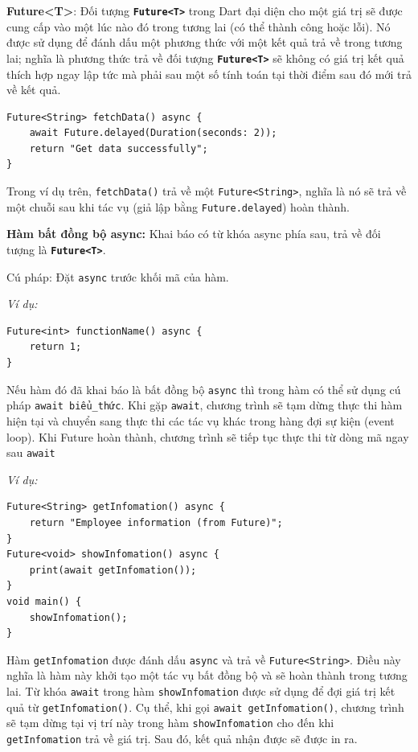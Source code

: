 \documentclass[../DoAn.tex]{subfiles}
\numberwithin{figure}{chapter}
\begin{document}
\textbf{Future<T>}: Đối tượng \textbf{\texttt{Future<T>}} trong Dart đại diện cho một giá trị sẽ được cung cấp vào một lúc nào đó trong tương lai (có thể thành công hoặc lỗi). Nó được sử dụng để đánh dấu một phương thức với một kết quả trả về trong tương lai; nghĩa là phương thức trả về đối tượng \textbf{\texttt{Future<T>}} sẽ không có giá trị kết quả thích hợp ngay lập tức mà phải sau một số tính toán tại thời điểm sau đó mới trả về kết quả. 
\begin{lstlisting}
Future<String> fetchData() async {
    await Future.delayed(Duration(seconds: 2));
    return "Get data successfully";
}
\end{lstlisting}

Trong ví dụ trên, \verb|fetchData()| trả về một {\texttt{Future<String>}}, nghĩa là nó sẽ trả về một chuỗi sau khi tác vụ (giả lập bằng \texttt{Future.delayed}) hoàn thành. 

\textbf{Hàm bất đồng bộ async:} Khai báo có từ khóa async phía sau, trả về đối tượng là \textbf{\texttt{Future<T>}}.

Cú pháp: Đặt \texttt{async} trước khối mã của hàm. 

\textit{Ví dụ:}
\begin{lstlisting}
Future<int> functionName() async {
    return 1;
}
\end{lstlisting}

Nếu hàm đó đã khai báo là bất đồng bộ \texttt{async} thì trong hàm có
thể sử dụng cú pháp \texttt{await biểu\_thức}. Khi gặp \texttt{await}, chương trình sẽ tạm dừng thực thi hàm hiện tại và chuyển sang thực thi các tác vụ khác trong hàng đợi sự kiện (event loop). Khi Future hoàn thành, chương trình sẽ tiếp tục thực thi từ dòng mã ngay sau \texttt{await}

\textit{Ví dụ:}
\begin{lstlisting}
Future<String> getInfomation() async {  
    return "Employee information (from Future)"; 
}
Future<void> showInfomation() async { 
    print(await getInfomation()); 
}
void main() { 
    showInfomation(); 
}
\end{lstlisting}

Hàm \verb|getInfomation| được đánh dấu \verb|async| và trả về \verb|Future<String>|. Điều này nghĩa là hàm này khởi tạo một tác vụ bất đồng bộ và sẽ hoàn thành trong tương lai. Từ khóa \verb|await| trong hàm \verb|showInfomation| được sử dụng để đợi giá trị kết quả từ \verb|getInfomation()|. Cụ thể, khi gọi \verb|await getInfomation()|, chương trình sẽ tạm dừng tại vị trí này trong hàm \verb|showInfomation| cho đến khi \verb|getInfomation| trả về giá trị. Sau đó, kết quả nhận được sẽ được in ra. 
\end{document}
